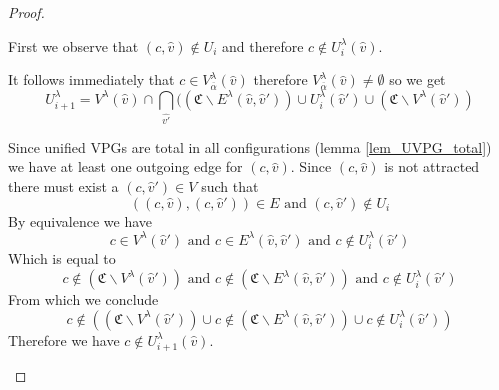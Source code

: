 \begin{lemma}
\begin{proof}
\begin{itemize}
			First we observe that $(c,\hat{v}) \notin U_i$ and therefore $c \notin U^\lambda_i(\hat{v})$.
			
			It follows immediately that $c \in V^\lambda_{\overline{\alpha}}(\hat{v})$ therefore $V^\lambda_{\overline{\alpha}}(\hat{v}) \neq \emptyset$ so we get
			\[ U^\lambda_{i+1} =V^\lambda(\hat{v}) \cap \bigcap_{\hat{v'}}((\mathfrak{C} \backslash E^\lambda(\hat{v},\hat{v}')) \cup U^\lambda_i(\hat{v}') \cup (\mathfrak{C}\backslash V^\lambda(\hat{v}')) \]
			
			Since unified VPGs are total in all configurations (lemma \ref{lem_UVPG_total}) we have at least one outgoing edge for $(c,\hat{v})$. Since $(c,\hat{v})$ is not attracted there must exist a $(c,\hat{v}') \in V$ such that 
			\[ ((c,\hat{v}),(c,\hat{v}')) \in E  \text{ and } (c,\hat{v}') \notin U_i \]
			By equivalence we have 
			\[ c \in V^\lambda(\hat{v}')  \text{ and } c \in E^\lambda(\hat{v},\hat{v}')  \text{ and } c \notin U^\lambda_i(\hat{v}') \]
			Which is equal to
			\[ c \notin (\mathfrak{C} \backslash V^\lambda(\hat{v}'))  \text{ and } c \notin (\mathfrak{C} \backslash E^\lambda(\hat{v},\hat{v}'))  \text{ and } c \notin U^\lambda_i(\hat{v}') \]
			From which we conclude
			\[ c \notin ((\mathfrak{C} \backslash V^\lambda(\hat{v}')) \cup c \notin (\mathfrak{C} \backslash E^\lambda(\hat{v},\hat{v}')) \cup c \notin U^\lambda_i(\hat{v}')) \]
			Therefore we have $c \notin U^\lambda_{i+1}(\hat{v})$.
		\end{itemize}
	\end{proof}
\end{lemma}

